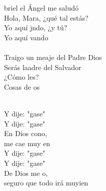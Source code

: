 \begin{cancion}[Hágase][Migueli]%
	briel el Ángel me saludó\\
	Hola, Mara, ¿qué tal estás?\\
	Yo aquí jndo, ¿y tú?\\
	Yo aquí vando\\
\jump\\
	Traigo un meaje del Padre Dios\\
	Serás laadre del Salvador\\
	¿Cómo les?\\
	Cosas de os\\\jump\\
	\begin{chorus}%
	Y dije: "gase" \\
	Y dije: "gase" \\
	En Dios cono, \\
	me cae muy en\\
	Y dije: "gase" \\
	Y dije: "gase" \\
	De Dios me o,\\
	seguro que todo irá muyien\\
	\end{chorus}%
	\jump\\
\end{cancion}%
